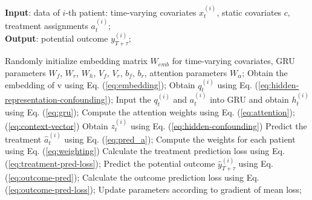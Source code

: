 \begin{algorithm}
	\caption{\model Model}
	\label{algorithm}
	\textbf{Input}: data of $i$-th patient: time-varying covariates $x^{(i)}_t$, static covariates $c$, treatment assignments $a^{(i)}_t$;\\
	\textbf{Output}: potential outcome $y^{(i)}_{T+\tau}$;
	\begin{algorithmic}[1]
    	\State Randomly initialize embedding matrix $W_{emb}$ for time-varying covariates, GRU parameters $W_f$, $W_r$, $W_h$, $V_f$, $V_r$, $b_f$, $b_r$, attention parameters $W_{\alpha}$;
    	\Repeat
    	\State Obtain the embedding of v using Eq. (\ref{eq:embedding});
    	\State Obtain $q^{(i)}_t$ using Eq. (\ref{eq:hidden-representation-confounding});
    	\State Input the $q^{(i)}_t$ and $a^{(i)}_{t}$ into GRU and obtain $h^{(i)}_{t}$ using Eq. (\ref{eq:gru});
    	\State Compute the attention weights using Eq. (\ref{eq:attention}); (\ref{eq:context-vector})\;
    	\State Obtain $z^{(i)}_{t}$ using Eq. (\ref{eq:hidden-confounding})\;
    	\EndFor
    	\State Predict the treatment $\hat{a}^{(i)}_{t}$ using Eq. (\ref{eq:pred_a});
    	\State Compute the weights for each patient using Eq. (\ref{eq:weighting})
    	\State Calculate the treatment prediction loss using Eq. (\ref{eq:treatment-pred-loss});
    	\State Predict the potential outcome $\hat{y}^{(i)}_{T+\tau}$ using Eq. (\ref{eq:outcome-pred});
    	\State Calculate the outcome prediction loss using Eq. (\ref{eq:outcome-pred-loss});
    	\State Update parameters according to gradient of mean loss;
	\end{algorithmic} 
\end{algorithm} 

